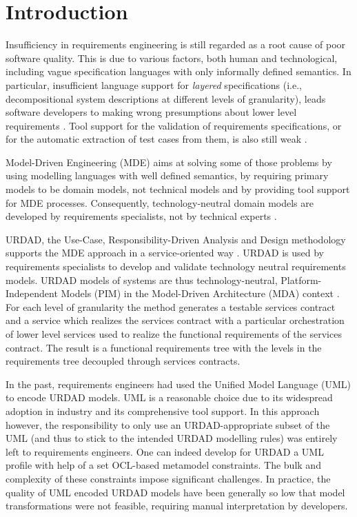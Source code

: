 \section{Introduction}
Insufficiency in requirements engineering is still regarded as a root cause of poor software quality. This is due to various factors, both human and technological, including vague specification languages with only informally defined semantics. In particular, insufficient language support for \emph{layered} specifications (i.e., decompositional system descriptions at different levels of granularity), leads software developers to making wrong presumptions about lower level requirements \cite{espana_evaluating_2009}. Tool support for the validation of requirements specifications, or for the automatic extraction of test cases from them, is also still weak \cite{bashardoust-tajali_extracting_2008}.

Model-Driven Engineering (MDE) \cite{schmidt_model_2006} aims at solving some of those problems by using modelling languages with well defined semantics, by requiring primary models to be domain models, not technical models \cite{asnina_computation_2010} and by providing tool support for MDE processes. Consequently, technology-neutral domain models are developed by requirements specialists, not by technical experts \cite{asnina_computation_2010}.

URDAD, the Use-Case, Responsibility-Driven Analysis and Design methodology \cite{fritz_solms_technology_2007} supports the MDE approach in a service-oriented way \cite{solms_urdad_2010}. URDAD is used by requirements specialists to develop and validate 
technology neutral requirements models. URDAD models of systems are thus technology-neutral, Platform-Independent Models (PIM) 
in the Model-Driven Architecture (MDA) context \cite{solms_urdad_2010}. For each level of granularity the method generates a testable services contract and a service which realizes the services contract with a particular orchestration of lower level services used to realize the functional requirements of the services contract. The result is a functional requirements tree with the levels in the requirements tree decoupled through services contracts.

In the past, requirements engineers had used the Unified Model Language (UML) to encode URDAD models. UML is a reasonable choice due to its widespread adoption in industry and its comprehensive tool support. In this approach however, the responsibility to only use an URDAD-appropriate subset of the UML (and thus to stick to the intended URDAD modelling rules) was entirely left to requirements engineers. One can indeed develop for URDAD a UML profile with help of a set OCL-based metamodel constraints. The bulk and complexity of these constraints impose significant challenges. In practice, the quality of UML encoded URDAD models have been generally so low that model transformations were not feasible, requiring manual interpretation by developers.

